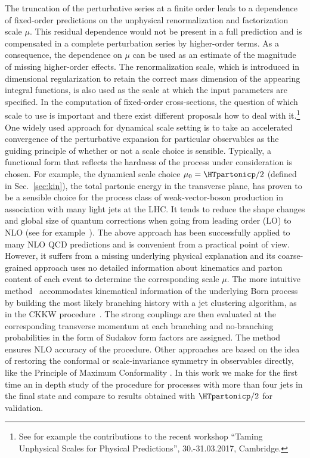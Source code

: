 The truncation of the perturbative series at a finite
order leads to a dependence of fixed-order predictions on the unphysical renormalization
and factorization scale $\mu$. This residual dependence would not be present in a full prediction and is compensated in a complete perturbation series by higher-order terms. As a consequence, the dependence on $\mu$ can be used as an estimate of the magnitude of missing higher-order effects. The renormalization scale, which is introduced in dimensional regularization to retain the correct mass dimension of the appearing integral functions, is also used as the scale at which the input parameters are specified. In the computation of fixed-order cross-sections, the question of which scale to use is important and there exist different
proposals how to deal with it.\footnote{See for example the contributions to the recent
  workshop ``Taming Unphysical Scales for Physical Predictions'',
  30.-31.03.2017, Cambridge.} One widely used approach for dynamical scale setting is to take an accelerated convergence of the perturbative expansion for
particular observables as the guiding principle \cite{Czakon:2016dgf} of whether or
not a scale choice is sensible. Typically, a functional form that reflects the hardness of the process under consideration is chosen. For example, the dynamical scale choice $\mu_0=\HTpartonicp/2$ (defined in Sec.~\ref{sec:kin}), the total partonic energy in the transverse plane, has
proven to be a sensible choice for the process class of weak-vector-boson production in association with many light jets at the LHC. It tends to reduce the shape changes and global size of quantum corrections
when going from leading order (LO) to NLO (see for
example~\cite{BH:W5j,BH:Z4j,BH:Wratios}). The above approach has been successfully applied to many NLO
QCD predictions and is
convenient from a practical point of view. However, it suffers from a
missing underlying physical explanation and its coarse-grained approach uses no detailed information about kinematics and parton content
of each event to determine the corresponding scale $\mu$. The more intuitive \MINLO{} method~\cite{MINLO} accommodates kinematical information of the underlying Born process by building the most likely branching history with a jet clustering algorithm, as in the CKKW procedure~\cite{CKKW}. The strong couplings are then evaluated at the corresponding transverse momentum at each branching and no-branching probabilities in the form of Sudakov form factors are assigned. The \MINLO{} method ensures NLO accuracy of the procedure. Other approaches are based on the idea of restoring the
conformal or scale-invariance symmetry in observables directly, like the Principle of Maximum
Conformality \cite{Brodsky:2011ta,Mojaza:2012mf}. In this work we make
for the first time an in depth study of the \MINLO{} procedure for
processes with more than four jets in the final state and compare to results obtained with $\HTpartonicp/2$ for validation.



